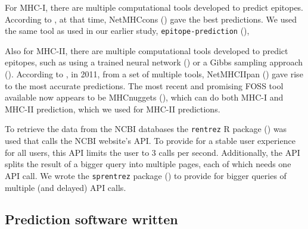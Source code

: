 
For MHC-I, there are multiple computational tools developed 
to predict epitopes. 
According to \cite{lundegaard2011prediction}, at that time,
NetMHCcons (\cite{karosiene2012netmhccons}) gave the best predictions.
We used the same tool as used in our earlier study, \verb;epitope-prediction; (\cite{bianchi2017}),


Also for MHC-II, there are multiple computational tools developed 
to predict epitopes,
such as using a trained neural network (\cite{nielsen2003reliable})
or a Gibbs sampling approach (\cite{nielsen2004improved}).
According to \cite{lundegaard2011prediction}, in 2011,
from a set of multiple tools, 
NetMHCIIpan (\cite{nielsen2008quantitative,karosiene2013netmhciipan})
gave rise to the most accurate predictions.
The most recent and promising FOSS tool available now appears
to be MHCnuggets (\cite{shao2020high}), which can do both MHC-I 
and MHC-II prediction, which we used for MHC-II predictions.


To retrieve the data from the NCBI databases the
\verb;rentrez; R package (\cite{rentrez}) was used
that calls the NCBI website's API. To provide for a 
stable user experience for all users, 
this API limits the user to 3 calls per second.
Additionally, the API splits the result of a bigger
query into multiple pages, each of which needs one API call.
We wrote the \verb;sprentrez; package (\cite{sprentrez}) to provide for 
bigger queries of multiple (and delayed) API calls.

\subsection{Prediction software written}

